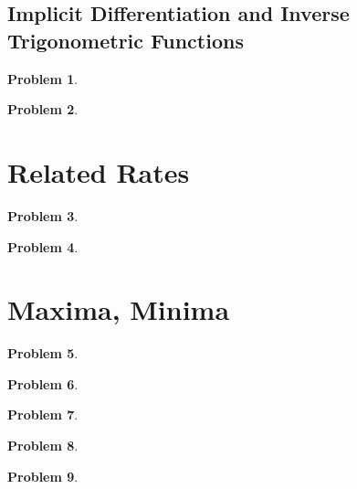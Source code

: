 \documentclass{article}
\newtheorem{problem}{Problem}
\begin{document}
\subsection{Implicit Differentiation and Inverse Trigonometric Functions}
\begin{problem}

\end{problem}
\begin{problem}

\end{problem}

\section{Related Rates}
\begin{problem}

\end{problem}

\begin{problem}

\end{problem}




\section{Maxima, Minima}


\begin{problem}

\end{problem}

\begin{problem}

\end{problem}

\begin{problem}

\end{problem}

\begin{problem}

\end{problem}

\begin{problem}

\end{problem}

\end{document}

